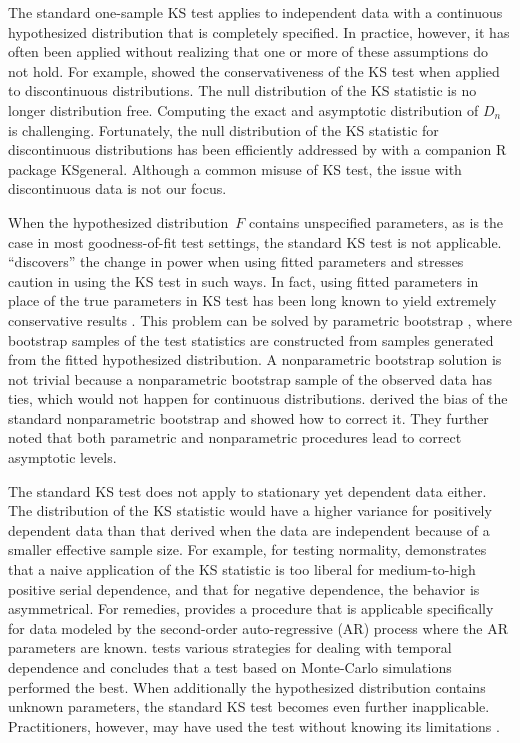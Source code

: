 \documentclass[12pt, letterpaper, titlepage]{article}
\begin{document}
The standard one-sample KS test applies to independent data with a continuous
hypothesized distribution that is completely specified. In practice, however, it
has often been applied without realizing that one or more of these assumptions
do not hold. For example, \citet{noether1963note} showed the conservativeness of
the KS test when applied to discontinuous distributions. The null distribution
of the KS statistic is no longer distribution free. Computing the
exact and asymptotic distribution of $D_n$ is challenging. Fortunately, the null
distribution of the KS statistic for discontinuous distributions has been
efficiently addressed by \citet{dimitrova2020computing} with a
companion R package \textsf{KSgeneral}. Although a common misuse of KS test, the
issue with discontinuous data is not our focus.


When the hypothesized distribution~$F$ contains unspecified parameters, as is
the case in most goodness-of-fit test settings, the standard KS test is not
applicable. \citet{steinskog2007cautionary} ``discovers'' the change in power
when using fitted parameters and stresses caution in using the KS test in
such ways. In fact, using fitted parameters in place of the true parameters in
KS test has been long known to yield extremely conservative results
\citep[e.g.,][]{lilliefors1967kolmogorov}. This problem can be solved by
parametric bootstrap \citep{efron1985bootstrap, hall1991two}, where
bootstrap samples of the test statistics are constructed from samples
generated from the fitted hypothesized distribution. A nonparametric bootstrap
solution is not trivial because a nonparametric bootstrap sample of the
observed data has ties, which would not happen for continuous distributions.
\citet{babu2004goodness} derived the bias of the standard nonparametric 
bootstrap and
showed how to correct it. They further noted that both parametric and
nonparametric procedures lead to correct asymptotic levels.


The standard KS test does not apply to stationary yet dependent data either. The
distribution of the KS statistic would have a higher variance for positively
dependent data than that derived when the data are independent because of a
smaller effective sample size. For example, for testing normality,
\citet{durilleul1992lack} demonstrates that a naive application of
the KS statistic is too liberal for medium-to-high positive serial dependence,
and that for negative dependence, the behavior is asymmetrical. For remedies,
\citet{weiss1978modification} provides a procedure that is applicable 
specifically for data
modeled by the second-order auto-regressive (AR) process where the AR parameters
are known. \citet{lanzante2021testing} tests various strategies for dealing with
temporal
dependence and concludes that a test based on Monte-Carlo simulations performed
the best. When additionally the hypothesized distribution contains unknown
parameters, the standard KS test becomes even further
inapplicable. Practitioners, however, may have used the test without knowing its
limitations \citep[e.g.,][]{tuncer2019online}.
\end{document}
